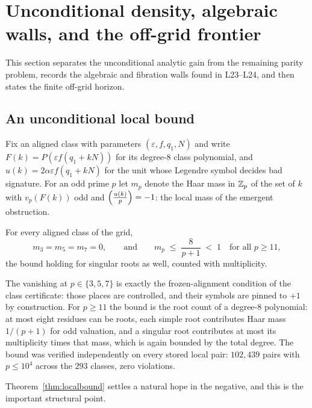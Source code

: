 \section{Unconditional density, algebraic walls, and the off-grid frontier}
\label{sec:frontier}

This section separates the unconditional analytic gain from the remaining
parity problem, records the algebraic and fibration walls found in L23--L24,
and then states the finite off-grid horizon.

\subsection{An unconditional local bound}

Fix an aligned class with parameters $(\varepsilon,f,q_1,N)$ and write
$F(k) = P(\varepsilon f (q_1 + kN))$ for its degree-$8$ class
polynomial, and $u(k) = 2\alpha\varepsilon f(q_1+kN)$ for the unit whose
Legendre symbol decides bad signature. For an odd prime $p$ let $m_p$
denote the Haar mass in $\mathbb{Z}_p$ of the set of $k$ with $v_p(F(k))$ odd and
$\left(\frac{u(k)}{p}\right) = -1$: the local mass of the emergent obstruction.

\begin{theorem}
\label{thm:localbound}
For every aligned class of the grid,
\[
   m_3 = m_5 = m_7 = 0,
   \qquad\text{and}\qquad
   m_p \;\le\; \frac{8}{p+1} \;<\; 1
   \quad\text{for all } p \ge 11 ,
\]
the bound holding for singular roots as well, counted with
multiplicity.
\end{theorem}

The vanishing at $p \in \{3,5,7\}$ is exactly the frozen-alignment
condition of the class certificate: those places are controlled, and
their symbols are pinned to $+1$ by construction. For $p \ge 11$ the
bound is the root count of a degree-$8$ polynomial: at most eight
residues can be roots, each simple root contributes Haar mass
$1/(p+1)$ for odd valuation, and a singular root contributes at most
its multiplicity times that mass, which is again bounded by the total
degree. The bound was verified independently on every stored local
pair: $102{,}439$ pairs with $p \le 10^4$ across the $293$ classes,
zero violations.

Theorem~\ref{thm:localbound} settles a natural hope in the negative,
and this is the important structural point.

